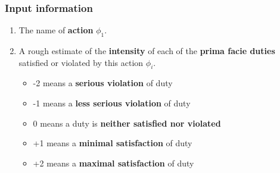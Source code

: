 \documentclass[11pt]{article}
\begin{document}
\subsubsection{Input information}
\label{sec:org4dd21d8}
\begin{enumerate}
\item The name of \textbf{action} \(\phi_1\).
\item A rough estimate of the \textbf{intensity} of each of the \textbf{prima facie duties} satisfied or violated by this action \(\phi_i\).
\begin{itemize}
\item -2 means a \textbf{serious violation} of duty
\item -1 means a \textbf{less serious violation} of duty
\item 0 means a duty is \textbf{neither satisfied nor violated}
\item +1 means a \textbf{minimal satisfaction} of duty
\item +2 means a \textbf{maximal satisfaction} of duty
\end{itemize}
\end{enumerate}

 \newpage
\end{document}
